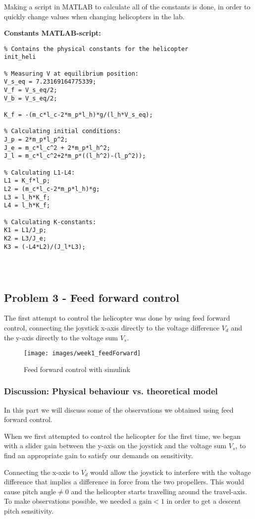 {Making a script in MATLAB to calculate all of the constants is done, in order to quickly change values when changing helicopters in the lab.

\textbf{Constants MATLAB-script:}
\begin{lstlisting}
% Contains the physical constants for the helicopter
init_heli 

% Measuring V at equilibrium position:
V_s_eq = 7.23169164775339; 
V_f = V_s_eq/2;
V_b = V_s_eq/2;

K_f = -(m_c*l_c-2*m_p*l_h)*g/(l_h*V_s_eq); 

% Calculating initial conditions:
J_p = 2*m_p*l_p^2;
J_e = m_c*l_c^2 + 2*m_p*l_h^2;
J_l = m_c*l_c^2+2*m_p*((l_h^2)-(l_p^2));

% Calculating L1-L4:
L1 = K_f*l_p;
L2 = (m_c*l_c-2*m_p*l_h)*g;
L3 = l_h*K_f;
L4 = l_h*K_f;

% Calculating K-constants:
K1 = L1/J_p; 
K2 = L3/J_e;
K3 = (-L4*L2)/(J_l*L3);


    
\end{lstlisting}

\subsection{Problem 3 - Feed forward control}
The first attempt to control the helicopter was done by using feed forward control, connecting the joystick x-axis directly to the voltage difference $V_d$ and the y-axis directly to the voltage sum $V_s$.

\begin{figure}[!htb]
 \centering
    \texttt{[image: images/week1\_feedForward]}
   
    \caption{Feed forward control with simulink}
    \label{sim:1}
\end{figure}

\subsubsection{Discussion: Physical behaviour vs. theoretical model}
In this part we will discuss some of the observations we obtained using feed forward control.

When we first attempted to control the helicopter for the first time, we began with a slider gain between the y-axis on the joystick and the voltage sum $V_s$, to find an appropriate gain to satisfy our demands on sensitivity.

Connecting the x-axis to $V_d$ would allow the joystick to interfere with the voltage difference that implies a difference in force from the two propellers. This would cause $\text{pitch angle} \neq 0$ and the helicopter starts travelling around the travel-axis. 
To make observations possible, we needed a $\text{gain} < 1$ in order to get a descent pitch sensitivity.

}
